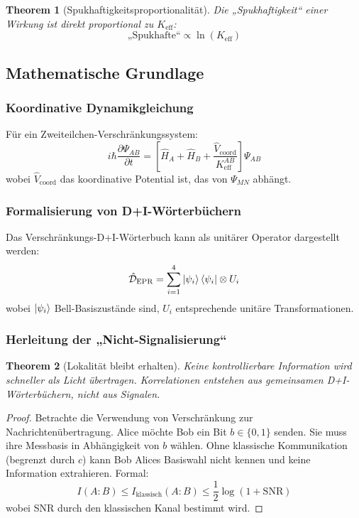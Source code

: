 \documentclass[11pt,a4paper]{article}
\newtheorem{theorem}{Theorem}
\begin{document}
	\begin{theorem}[Spukhaftigkeitsproportionalität]
		Die „Spukhaftigkeit“ einer Wirkung ist direkt proportional zu $K_{\mathrm{eff}}$:
		\begin{equation}
			\text{„Spukhafte“} \propto \ln(K_{\mathrm{eff}})
		\end{equation}
	\end{theorem}
	
	\subsection{Mathematische Grundlage}
	\label{subsec:math-foundation}
	
	\subsubsection{Koordinative Dynamikgleichung}
	Für ein Zweiteilchen-Verschränkungssystem:
	\begin{equation}
		i\hbar \frac{\partial \Psi_{AB}}{\partial t} = \left[ \hat{H}_A + \hat{H}_B + \frac{\hat{V}_{\text{coord}}}{K_{\mathrm{eff}}^{AB}} \right] \Psi_{AB}
	\end{equation}
	wobei $\hat{V}_{\text{coord}}$ das koordinative Potential ist, das von $\Psi_{MN}$ abhängt.
	
	\subsubsection{Formalisierung von D+I-Wörterbüchern}
	Das Verschränkungs-D+I-Wörterbuch kann als unitärer Operator dargestellt werden:
	\begin{equation}
		\hat{\mathcal{D}}_{\text{EPR}} = \sum_{i=1}^{4} \ket{\psi_i}\bra{\psi_i} \otimes U_i
	\end{equation}
	wobei $\ket{\psi_i}$ Bell-Basiszustände sind, $U_i$ entsprechende unitäre Transformationen.
	
	\subsubsection{Herleitung der „Nicht-Signalisierung“}
	\begin{theorem}[Lokalität bleibt erhalten]
		Keine kontrollierbare Information wird schneller als Licht übertragen. Korrelationen entstehen aus gemeinsamen D+I-Wörterbüchern, nicht aus Signalen.
	\end{theorem}
	
	\begin{proof}
		Betrachte die Verwendung von Verschränkung zur Nachrichtenübertragung. Alice möchte Bob ein Bit $b \in \{0,1\}$ senden. Sie muss ihre Messbasis in Abhängigkeit von $b$ wählen. Ohne klassische Kommunikation (begrenzt durch $c$) kann Bob Alices Basiswahl nicht kennen und keine Information extrahieren. Formal:
		\begin{equation}
			I(A:B) \leq I_{\text{klassisch}}(A:B) \leq \frac{1}{2} \log(1 + \text{SNR})
		\end{equation}
		wobei SNR durch den klassischen Kanal bestimmt wird.
	\end{proof}
	
\end{document}
